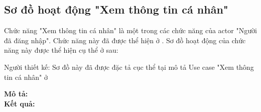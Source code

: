 \subsection{Sơ đồ hoạt động "Xem thông tin cá nhân"}
\setcounter{figure}{0}

Chức năng "Xem thông tin cá nhân" là một trong các chức năng của actor
"Người đã đăng nhập". Chức năng này đã được thể hiện ở .
Sơ đồ hoạt động của chức năng này được thể hiện cụ thể ở \myref{} sau:

Người thiết kế:
Sơ đồ này đã được đặc tả cục thể tại mô tả Use case "Xem thông tin cá nhân"
ở 

\noindent
\textbf{Mô tả:}\\

\noindent
\textbf{Kết quả:}


